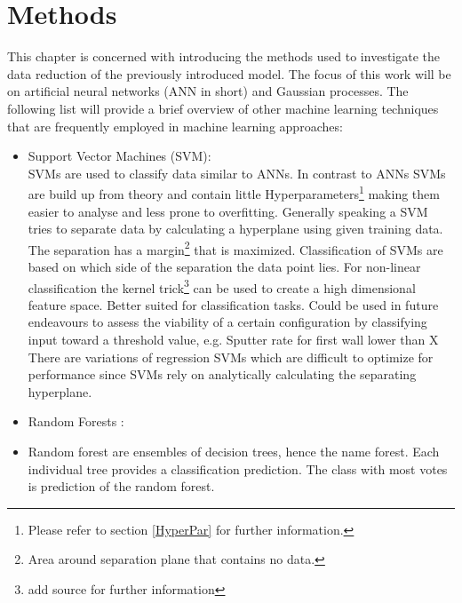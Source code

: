 \chapter{Methods}
	This chapter is concerned with introducing the methods used to investigate the data reduction of the previously introduced model. The focus of this work will be on artificial neural networks (ANN in short) and Gaussian processes.
	The following list will provide a brief overview of other machine learning techniques that are frequently employed in machine learning approaches:
	\begin{itemize}
		\item Support Vector Machines (SVM):\\
			SVMs are used to classify data similar to ANNs. In contrast to ANNs SVMs are build up from theory and contain little Hyperparameters\footnote{Please refer to section \ref{HyperPar} for further information.} making them easier to analyse and less prone to overfitting. Generally speaking a SVM tries to separate data by calculating a hyperplane using given training data. The separation has a margin\footnote{Area around separation plane that contains no data.} that is maximized. Classification of SVMs are based on which side of the separation the data point lies. For non-linear classification the kernel trick\footnote{add source for further information} can be used to create a high dimensional feature space.
			Better suited for classification tasks. Could be used in future endeavours to assess the viability of a certain configuration by classifying input toward a threshold value, e.g. Sputter rate for first wall lower than X \\
			There are variations of regression SVMs which are difficult to optimize for performance since SVMs rely on analytically calculating the separating hyperplane.\\
		\item Random Forests :\\
				\item Random forest are ensembles of decision trees, hence the name forest. Each individual tree provides a classification prediction. The class with most votes is prediction of the random forest.\\

\end{itemize}
